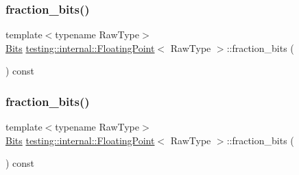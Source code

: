 \mbox{\label{classtesting_1_1internal_1_1_floating_point_aa17337e50a2ac855719bc0676529558f}} 
\subsubsection{\texorpdfstring{fraction\_bits()}{fraction\_bits()}\hspace{0.1cm}{\footnotesize\ttfamily [2/3]}}
{\footnotesize\ttfamily template$<$typename Raw\+Type$>$ \\
\mbox{\hyperlink{classtesting_1_1internal_1_1_floating_point_abf228bf6cd48f12c8b44c85b4971a731}{Bits}} \mbox{\hyperlink{classtesting_1_1internal_1_1_floating_point}{testing\+::internal\+::\+Floating\+Point}}$<$ Raw\+Type $>$\+::fraction\+\_\+bits (\begin{DoxyParamCaption}{ }\end{DoxyParamCaption}) const\hspace{0.3cm}{\ttfamily [inline]}}

\mbox{\label{classtesting_1_1internal_1_1_floating_point_aa17337e50a2ac855719bc0676529558f}} 
\subsubsection{\texorpdfstring{fraction\_bits()}{fraction\_bits()}\hspace{0.1cm}{\footnotesize\ttfamily [3/3]}}
{\footnotesize\ttfamily template$<$typename Raw\+Type$>$ \\
\mbox{\hyperlink{classtesting_1_1internal_1_1_floating_point_abf228bf6cd48f12c8b44c85b4971a731}{Bits}} \mbox{\hyperlink{classtesting_1_1internal_1_1_floating_point}{testing\+::internal\+::\+Floating\+Point}}$<$ Raw\+Type $>$\+::fraction\+\_\+bits (\begin{DoxyParamCaption}{ }\end{DoxyParamCaption}) const\hspace{0.3cm}{\ttfamily [inline]}}

